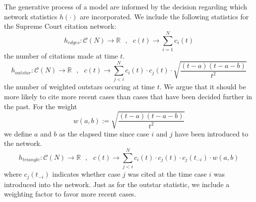 \documentclass[headsepline=true, abstracton]{scrartcl}
\begin{document}
The generative process of a model are informed by
the decision regarding which network statistics $h(\cdot)$ are incorporated. We include the following statistics for the Supreme Court citation network:
$$h_{edges}:\mathcal{C}(N)\to \mathbb{R}~~~, ~~~c(t) \to \sum_{i=1}^Nc_i(t)$$
the number of citations made at time $t$. 
$$h_{outstar}:\mathcal{C}(N)\to \mathbb{R}~~~, ~~~c(t) \to \sum_{j<i}^Nc_i(t)\cdot c_j(t) \cdot \sqrt{\dfrac{(t-a)(t-a-b)}{t^2}}$$
the number of weighted outstars occuring at time $t$. We argue that it should be more likely to cite more recent cases than cases that have been decided further in the past. For the weight 
$$w(a,b):= \sqrt{\dfrac{(t-a)(t-a-b)}{t^2}}$$
we define $a$ and $b$ as the elapsed time since case $i$ and $j$ have been introduced to the network.
$$h_{triangle}:\mathcal{C}(N)\to \mathbb{R}~~~, ~~~c(t) \to \sum_{j<i}^Nc_i(t)\cdot c_j(t) \cdot
c_j(t_{-i}) \cdot w(a,b)$$
where $c_j(t_{-i})$ indicates whether case $j$ was cited at the time case $i$ was introduced into the network. Just as for the outstar statistic, we include a weighting factor to favor more recent cases. \\[0.3cm]
\end{document}
